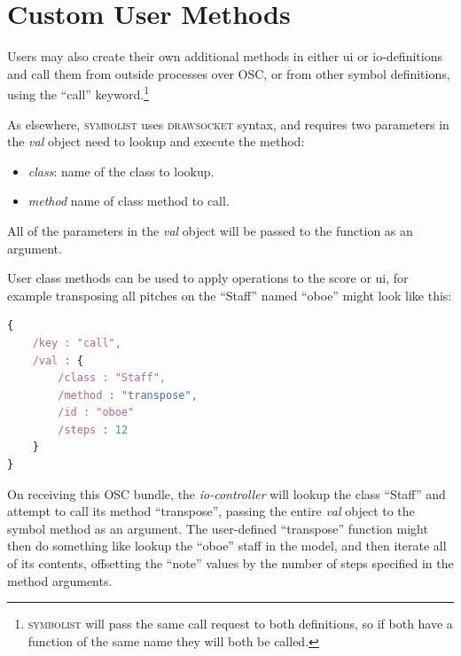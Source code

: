 \documentclass{article}
\def\symbolist{\textsc{symbolist}\xspace}
\def\drawsocket{\textsc{drawsocket}\xspace}
\def\iocontroller{\textit{io-controller}\xspace}
\def\oscfontsize{\tiny}
\begin{document}
\section{Custom User Methods}\label{sec:user_methods}

Users may also create their own additional methods in either ui or io-definitions and call them from outside processes over OSC, or from other symbol definitions, using the ``call'' keyword.\footnote{\symbolist will pass the same call request to both definitions, so if both have a function of the same name they will both be called.}

As elsewhere, \symbolist uses \drawsocket syntax, and requires two parameters  in the \textit{val} object need to lookup and execute the method:

\begin{itemize}\itemsep0pt 
 \item \textit{class}: name of the class to lookup.
  \item \textit{method} name of class method to call.
\end{itemize}

All of the parameters in the \textit{val} object will be passed to the function as an argument. 

User class methods can be used to apply operations to the score or ui, for example transposing all pitches on the ``Staff'' named ``oboe'' might look like this:

\begin{lstlisting}[language=Javascript,
belowskip=-2 \baselineskip,
  mathescape,
  columns=fullflexible,
  basicstyle=\oscfontsize\fontfamily{lmvtt}\selectfont,
]
{
    /key : "call",
    /val : {
        /class : "Staff",
        /method : "transpose",
        /id : "oboe"
        /steps : 12
    }
}
\end{lstlisting}

On receiving this OSC bundle, the \iocontroller will lookup the class ``Staff'' and attempt to call its method ``transpose'', passing the entire \textit{val} object to the symbol method as an argument. The user-defined ``transpose'' function might then do something like lookup the ``oboe'' staff in the model, and then iterate all of its contents, offsetting the ``note'' values by the number of steps specified in the method arguments.

\end{document}
